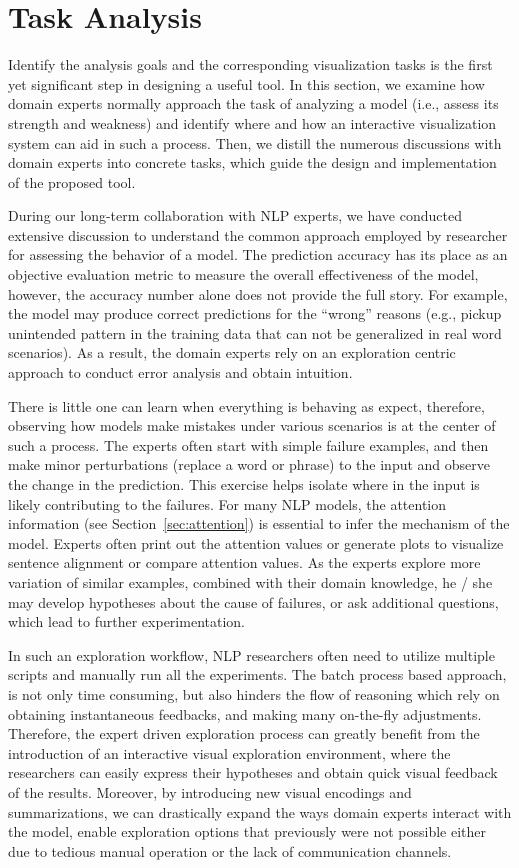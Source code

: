 \section{Task Analysis}
\label{sec:task}
Identify the analysis goals and the corresponding visualization tasks is the first yet significant step in designing a useful tool. In this section, we examine how domain experts normally approach the task of analyzing a model (i.e., assess its strength and weakness) and identify where and how an interactive visualization system can aid in such a process.
Then, we distill the numerous discussions with domain experts into concrete tasks, which guide the design and implementation of the proposed tool.

During our long-term collaboration with NLP experts, we have conducted extensive discussion to understand the common approach employed by researcher for assessing the behavior of a model.%
The prediction accuracy has its place as an objective evaluation metric to measure the overall effectiveness of the model, however, the accuracy number alone does not provide the full story.
For example, the model may produce correct predictions for the ``wrong'' reasons (e.g., pickup unintended pattern in the training data that can not be generalized in real word scenarios).
%
As a result, the domain experts rely on an exploration centric approach to conduct error analysis and obtain intuition.

There is little one can learn when everything is behaving as expect, therefore,
observing how models make mistakes under various scenarios is at the center of such a process.
The experts often start with simple failure examples, and then make minor perturbations (replace a word or phrase) to the input and observe the change in the prediction. This exercise helps isolate where in the input is likely contributing to the failures. For many NLP models, the attention information (see Section~\ref{sec:attention}) is essential to infer the mechanism of the model. Experts often print out the attention values or generate plots to visualize sentence alignment or compare attention values. As the experts explore more variation of similar examples, combined with their domain knowledge, he / she may develop hypotheses about the cause of failures, or ask additional questions, which lead to further experimentation.

In such an exploration workflow, NLP researchers often need to utilize multiple scripts and manually run all the experiments. The batch process based approach, is not only time consuming, but also hinders the flow of reasoning which rely on obtaining instantaneous feedbacks, and making many on-the-fly adjustments.
%
Therefore, the expert driven exploration process can greatly benefit from the introduction of an interactive visual exploration environment, where the researchers can easily express their hypotheses and obtain quick visual feedback of the results.
%
Moreover, by introducing new visual encodings and summarizations, we can drastically expand the ways domain experts interact with the model, enable exploration options that previously were not possible either due to tedious manual operation or the lack of communication channels.

